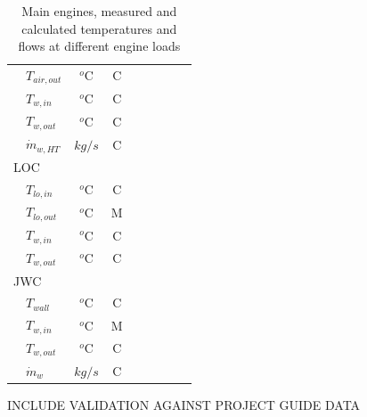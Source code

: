 \documentclass[preprint,12pt]{elsarticle}
\begin{document}
\begin{table}
\begin{tabular}{llccrrrrr}
		&	$T_{air,out}$   	& $^o$C & C  & & & & &  \\ 
		&	$T_{w,in}$    		& $^o$C & C  & & & & &  \\ 
		&	$T_{w,out}$   		& $^o$C & C  & & & & &  \\ 
		& 	$\dot{m}_{w,HT}$  	& $kg/s$ & C & & & & &  \\
		\multicolumn{2}{l}{LOC} & & & & & & &  \\
		&	$T_{lo,in}$   		& $^o$C & C  & & & & &  \\  
		&	$T_{lo,out}$    	& $^o$C & M  & & & & &  \\ 
		&	$T_{w,in}$    		& $^o$C & C  & & & & &  \\ 
		&	$T_{w,out}$   		& $^o$C & C  & & & & &  \\ 
		\multicolumn{2}{l}{JWC} & & & & & & &  \\
		&	$T_{wall}$    		& $^o$C & C  & & & & &  \\ 
		&	$T_{w,in}$    		& $^o$C & M  & & & & &  \\ 
		&	$T_{w,out}$	   		& $^o$C & C  & & & & &  \\ 
		& 	$\dot{m}_{w}$  		& $kg/s$ & C & & & & &  \\
		\hline
		\end{tabular}
	\caption{Main engines, measured and calculated temperatures and flows at different engine loads}
\end{table}

INCLUDE VALIDATION AGAINST PROJECT GUIDE DATA
\end{document}
